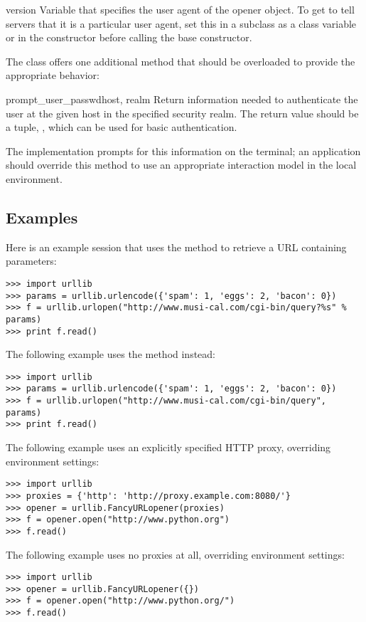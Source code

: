 \begin{memberdesc}[URLopener]{version}
Variable that specifies the user agent of the opener object.  To get
 to tell servers that it is a particular user agent,
set this in a subclass as a class variable or in the constructor
before calling the base constructor.
\end{memberdesc}

The  class offers one additional method that
should be overloaded to provide the appropriate behavior:

\begin{methoddesc}[FancyURLopener]{prompt_user_passwd}{host, realm}
Return information needed to authenticate the user at the given host
in the specified security realm.  The return value should be a tuple,
, which can be used for basic
authentication.

The implementation prompts for this information on the terminal; an
application should override this method to use an appropriate
interaction model in the local environment.
\end{methoddesc}


\subsection{Examples}

Here is an example session that uses the  method to retrieve
a URL containing parameters:

\begin{verbatim}
>>> import urllib
>>> params = urllib.urlencode({'spam': 1, 'eggs': 2, 'bacon': 0})
>>> f = urllib.urlopen("http://www.musi-cal.com/cgi-bin/query?%s" % params)
>>> print f.read()
\end{verbatim}

The following example uses the  method instead:

\begin{verbatim}
>>> import urllib
>>> params = urllib.urlencode({'spam': 1, 'eggs': 2, 'bacon': 0})
>>> f = urllib.urlopen("http://www.musi-cal.com/cgi-bin/query", params)
>>> print f.read()
\end{verbatim}

The following example uses an explicitly specified HTTP proxy,
overriding environment settings:

\begin{verbatim}
>>> import urllib
>>> proxies = {'http': 'http://proxy.example.com:8080/'}
>>> opener = urllib.FancyURLopener(proxies)
>>> f = opener.open("http://www.python.org")
>>> f.read()
\end{verbatim}

The following example uses no proxies at all, overriding environment
settings:

\begin{verbatim}
>>> import urllib
>>> opener = urllib.FancyURLopener({})
>>> f = opener.open("http://www.python.org/")
>>> f.read()
\end{verbatim}
